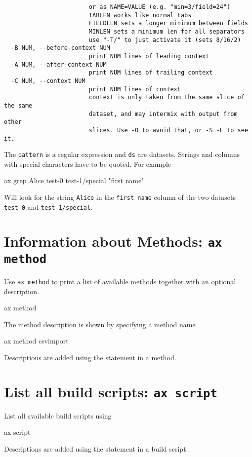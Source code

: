 \begin{snugshade}
\begin{verbatim}
                        or as NAME=VALUE (e.g. "min=3/field=24")
                        TABLEN works like normal tabs
                        FIELDLEN sets a longer minimum between fields
                        MINLEN sets a minimum len for all separators
                        use "-T/" to just activate it (sets 8/16/2)
  -B NUM, --before-context NUM
                        print NUM lines of leading context
  -A NUM, --after-context NUM
                        print NUM lines of trailing context
  -C NUM, --context NUM
                        print NUM lines of context
                        context is only taken from the same slice of the same
                        dataset, and may intermix with output from other
                        slices. Use -O to avoid that, or -S -L to see it.
\end{verbatim}
\end{snugshade}
\noindent The \texttt{pattern} is a regular expression and \texttt{ds} are
datasets.  Strings and columns with special characters have to be quoted.
For example
\begin{shell}
ax grep Alice test-0 test-1/special "first name"
\end{shell}
Will look for the string \texttt{Alice} in the \texttt{first name} column of
the two datasets \texttt{test-0} and \texttt{test-1/special}.


\section{Information about Methods: \texttt{ax method}}
Use \texttt{ax method} to print a list of available methods together
with an optional description.
\begin{shell}
ax method
\end{shell}
The method description is shown by specifying a method name
\begin{shell}
ax method csvimport
\end{shell}
Descriptions are added using the 
statement in a method.


\section{List all build scripts: \texttt{ax script}}
List all available build scripts using
\begin{shell}
ax script
\end{shell}
Descriptions are added using the 
statement in a build script.


